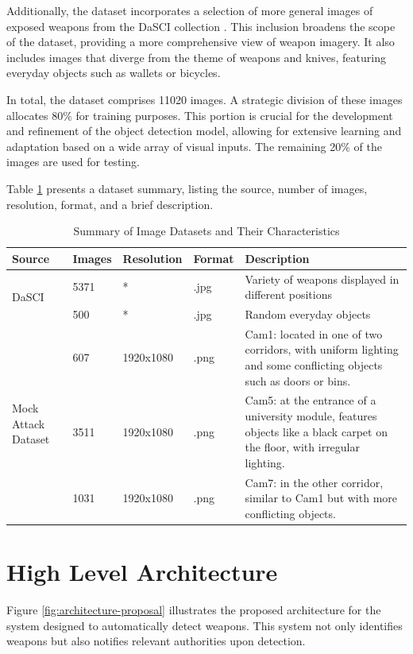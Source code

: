 Additionally, the dataset incorporates a selection of more general images of exposed weapons from the DaSCI collection \cite{rfc29}. This inclusion broadens the scope of the dataset, providing a more comprehensive view of weapon imagery. It also includes images that diverge from the theme of weapons and knives, featuring everyday objects such as wallets or bicycles.

In total, the dataset comprises 11020 images. A strategic division of these images allocates 80\% for training purposes. This portion is crucial for the development and refinement of the object detection model, allowing for extensive learning and adaptation based on a wide array of visual inputs. The remaining 20\% of the images are used for testing. 

Table \ref{datasets-table} presents a dataset summary, listing the source, number of images, resolution, format, and a brief description.
\begin{table}[ht]
    \centering
    \begin{tabularx}{\textwidth}{|l|l|l|l|X|}
    \hline
    \textbf{Source} & \textbf{Images} & \textbf{Resolution} & \textbf{Format} & \textbf{Description} \\ \hline
    \multirow{2}{*}{DaSCI \cite{rfc29}} & 5371 & * & .jpg & Variety of weapons displayed in different positions \\ \cline{2-5}
        & 500 & * & .jpg & Random everyday objects \\ \hline

    \multirow{3}{*}{\centering Mock Attack Dataset \cite{rfc45}} & 607 & 1920x1080 & .png & 
    Cam1: located in one of two corridors, with uniform lighting and some conflicting objects such as doors or bins. \\ \cline{2-5}
     & 3511 & 1920x1080 & .png & 
    Cam5: at the entrance of a university module, features objects like a black carpet on the floor, with irregular lighting. \\ \cline{2-5}
     & 1031 & 1920x1080 & .png & 
    Cam7: in the other corridor, similar to Cam1 but with more conflicting objects. \\ \hline
    \end{tabularx}
    \caption{Summary of Image Datasets and Their Characteristics}
    \label{datasets-table}
\end{table}

\section{High Level Architecture}
Figure \ref{fig:architecture-proposal} illustrates the proposed architecture for the system designed to automatically detect weapons. This system not only identifies weapons but also notifies relevant authorities upon detection. 

